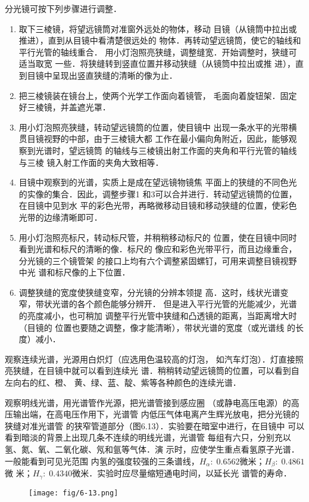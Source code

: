 分光镜可按下列步骤进行调整．
\begin{enumerate}
\item 取下三棱镜，将望远镜筒对准窗外远处的物体，移动
目镜（从镜筒中拉出或推进），直到从目镜中看清楚很远处的
物体．再转动望远镜筒，使它的轴线和平行光管的轴线重合．
用小灯泡照亮狭缝，调整缝宽．开始调整时，狭缝可适当取宽
一些．将狭缝转到竖直位置并移动狭缝（从镜筒中拉出或推
进），直到目镜中呈现出竖直狭缝的清晰的像为止．
\item 把三棱镜装在镜台上，使两个光学工作面向着镜管，
毛面向着旋钮架．固定好三棱镜，并盖遮光罩．
\item 用小灯泡照亮狭缝，转动望远镜筒的位置，使目镜中
出现一条水平的光带横贯目镜视野的中部，由于三棱镜大都
工作在最小偏向角附近，因此，能够观察到光谱时，望远镜筒
的轴线与三棱镜出射工作面的夹角和平行光管的轴线与三棱
镜入射工作面的夹角大致相等．
\item 目镜中观察到的光谱，实质上是成在望远镜物镜焦
平面上的狭缝的不同色光的实像的集合．因此，调整步骤1
和3可以合并进行．转动望远镜筒的位置，在目镜中见到水
平的彩色光带，再略微移动目镜和移动狭缝的位置，使彩色
光带的边缘清晰即可．
\item 用小灯泡照亮标尺，转动标尺管，并稍稍移动标尺的
位置，使在目镜中同时看到光谱和标尺的清晰的像．标尺的
像应和彩色光带平行，而且边缘重合，分光镜的三个镜管架
的接口上均有六个调整紧固螺钉，可用来调整目镜视野中光
谱和标尺像的上下位置．
\item 调整狭缝的宽度使狭缝变窄，分光镜的分辨本领提
高．这时，线状光谱变窄，带状光谱的各个颜色能够分辨开．
但是进入平行光管的光能减少，光谱的亮度减小，也可稍加
调整平行光管中狭缝和凸透镜的距离，当距离增大时（目镜的
位置也要随之调整，像才能清晰），带状光谱的宽度（或光谱线
的长度）减小．
\end{enumerate}

观察连续光谱，光源用白炽灯（应选用色温较高的灯泡，
如汽车灯泡）．灯直接照亮狭缝，在目镜中就可以看到连续光
谱．稍稍转动望远镜筒的位置，可以看到自左向右的红、橙、
黄、绿、蓝、靛、紫等各种颜色的连续光谱．

观察明线光谱，用光谱管作光源，把光谱管接到感应圈
（或静电高压电源）的高压输出端，在高电压作用下，光谱管
内低压气体电离产生辉光放电，把分光镜的狭缝对准光谱管
的狭窄管道部分（图6.13）．实验要在暗室中进行，在目镜中
可以看到暗淡的背景上出现几条不连续的明线光谱，光谱管
每组有六只，分别充以氢、氮、氧、二氧化碳、氖和氩等气体．演
示时，应使学生重点看氢原子光谱．一般能看到可见光范围
内氢的强度较强的三条谱线，$H_{\alpha}:\; 0.6562$微米；$H_{\beta}:\; 0.4861$微
米；$H_{\gamma}:\; 0.4340$微米．实验时应尽量缩短通电时间，以延长光
谱管的寿命．
\begin{figure}[htp]
    \centering
\texttt{[image: fig/6-13.png]}
    \caption{}
\end{figure}

